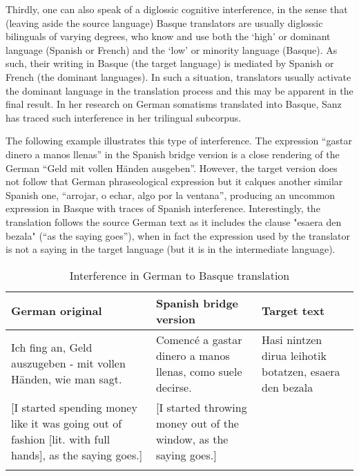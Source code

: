 \documentclass[output=paper]{LSP/langsci}
\begin{document}
Thirdly, one can also speak of a diglossic cognitive interference, in the sense that (leaving aside the source language) Basque translators are usually diglossic bilinguals of varying degrees, who know and use both the ‘high’ or dominant language (Spanish or French) and the ‘low’ or minority language (Basque). As such, their writing in Basque (the target language) is mediated by Spanish or French (the dominant languages). In such a situation, translators usually activate the dominant language in the translation process and this may be apparent in the final result. In her research on German somatisms translated into Basque, Sanz has traced such interference in her trilingual subcorpus.

The following example illustrates this type of interference. The expression “gastar dinero a manos llenas” in the Spanish bridge version is a close rendering of the German “Geld mit  vollen Händen ausgeben”. However, the target version does not follow that German phraseological expression but it calques another similar Spanish one, “arrojar, o echar, algo por la ventana”, producing an uncommon expression in Basque with traces of Spanish interference. Interestingly, the translation follows the source German text as it includes the clause "esaera den bezala" (“as the saying goes”), when in fact the expression used by the translator is not a saying in the target language (but it is in the intermediate language).

\begin{table}
     \centering
     \begin{tabularx}{\textwidth}{XXX}
     \lsptoprule
German original    & Spanish bridge version  & Target text  \\ 
\midrule
Ich fing an, Geld auszugeben - mit vollen Händen, wie man sagt.   &  Comencé a gastar dinero a manos llenas, como suele decirse.   &  Hasi nintzen dirua leihotik botatzen, esaera den bezala  \\ 
{[}I started spending money like it was going out of fashion {[}lit. with full hands{]}, as the saying goes.{]}  & {[}I started throwing money out of the window, as the saying goes.{]}  &  \\

     \lspbottomrule
     \end{tabularx}

 \caption{Interference in German to Basque translation}
     \label{3.1}
\end{table}
\end{document}
